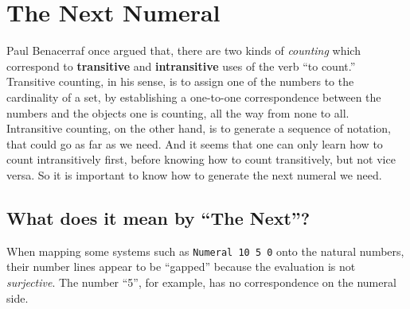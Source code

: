 \documentclass[\main/thesis.tex]{subfiles}
\begin{document}
\section{The Next Numeral}\label{next}

Paul Benacerraf once argued\cite{benacerraf1965numbers} that,
there are two kinds of \textit{counting} which correspond to \textbf{transitive}
and \textbf{intransitive} uses of the verb ``to count.''
Transitive counting, in his sense, is to assign one of the numbers to the
cardinality of a set,
by establishing a one-to-one correspondence between the numbers and the objects
one is counting, all the way from none to all.
Intransitive counting, on the other hand, is to generate a sequence of notation,
that could go as far as we need.
And it seems that one can only learn how to count intransitively first,
before knowing how to count transitively, but not vice versa.
So it is important to know how to generate the next numeral we need.

\subsection{What does it mean by ``The Next''?}

When mapping some systems such as {\lstinline|Numeral 10 5 0|} onto the natural
numbers, their number lines appear to be ``gapped'' because the evaluation is
not \textit{surjective}.
The number ``5'', for example, has no correspondence on the numeral side.

\begin{center}
    \begin{adjustbox}{max width=\textwidth}
    \end{adjustbox}
\end{center}
\end{document}
